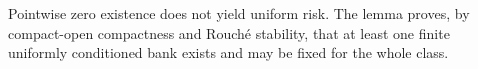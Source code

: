 Pointwise zero existence does not yield uniform risk.  The lemma proves, by compact-open compactness and Rouch\'e stability, that at least one finite uniformly conditioned bank exists and may be fixed for the whole class.